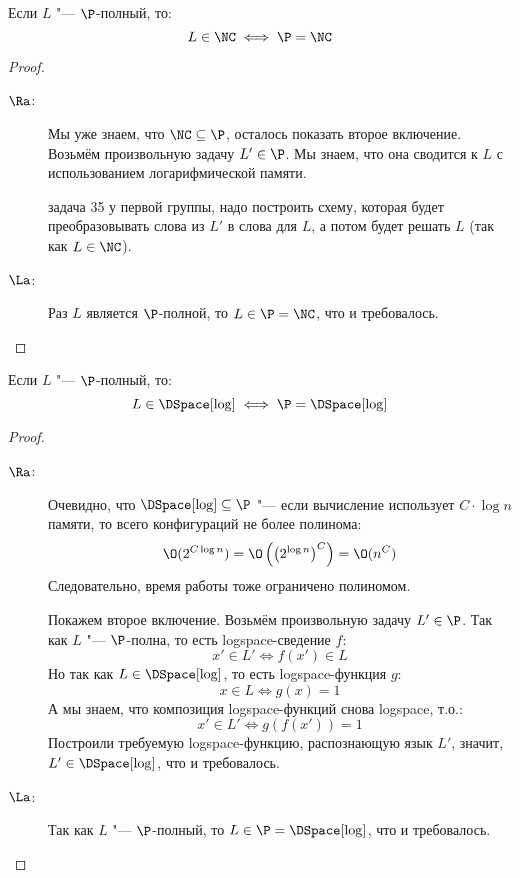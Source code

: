 	\begin{theorem}
		Если $L$ "--- $\P$-полный, то:
		\[ L \in \NC \iff \P = \NC \]
	\end{theorem}
	\begin{proof}
		\begin{description}
			\item[$\Ra$:]
				Мы уже знаем, что $\NC \subseteq \P$, осталось показать второе включение.
				Возьмём произвольную задачу $L' \in \P$.
				Мы знаем, что она сводится к $L$ с использованием логарифмической памяти.

				\TODO задача 35 у первой группы, надо построить схему, которая будет преобразовывать слова из $L'$ в слова для $L$,
				а потом будет решать $L$ (так как $L \in \NC$).
			\item[$\La$:]
				Раз $L$ является $\P$-полной, то $L\in \P = \NC$, что и требовалось.
		\end{description}
	\end{proof}
	\begin{theorem}
		Если $L$ "--- $\P$-полный, то:
		\[ L \in \DSpace[\log] \iff \P = \DSpace[\log] \]
	\end{theorem}
	\begin{proof}
		\begin{description}
			\item[$\Ra$:]
				Очевидно, что $\DSpace[\log] \subseteq \P$ "--- если вычисление использует $C \cdot \log n$ памяти,
				то всего конфигураций не более полинома:
				\[ \O(2^{C\log n})=\O\left(\left(2^{\log n}\right)^C\right)=\O(n^C) \]
				Следовательно, время работы тоже ограничено полиномом.

				Покажем второе включение.
				Возьмём произвольную задачу $L' \in \P$.
				Так как $L$ "--- $\P$-полна, то есть logspace-сведение $f$:
				\[ x' \in L' \iff f(x') \in L \]
				Но так как $L \in \DSpace[\log]$, то есть logspace-функция $g$:
				\[ x \in L \iff g(x) = 1 \]
				А мы знаем, что композиция logspace-функций снова logspace, т.о.:
				\[ x' \in L' \iff g(f(x')) = 1\]
				Построили требуемую logspace-функцию, распознающую язык $L'$, значит, $L' \in \DSpace[\log]$, что и требовалось.
			\item[$\La$:]
				Так как $L$ "--- $\P$-полный, то $L \in \P = \DSpace[\log]$, что и требовалось.
		\end{description}
	\end{proof}

